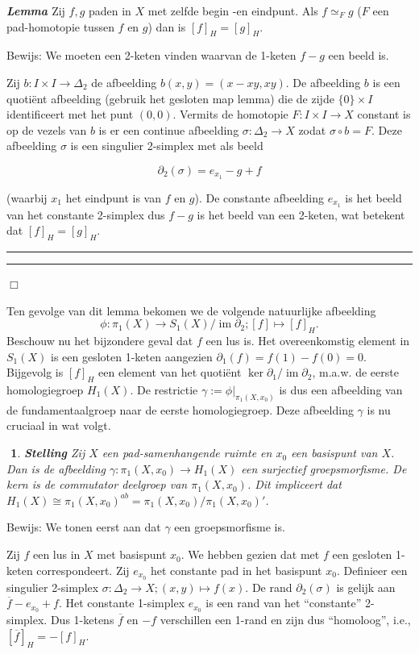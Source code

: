 \documentclass[12pt]{book}
\DeclareMathOperator{\Ima}{im}
\newcommand{\bew}{{\sc Bewijs: }}
\newcommand{\B}{\rule{1mm}{0mm} \hfill $\Box$ }
\newtheorem{stelh}{$\!\!$}[section]
\newenvironment{stel}{\begin{stelh}{\em {\bf Stelling }}}{\end{stelh}}
\newenvironment{lem}{\begin{lemh}{\em {\bf Lemma }}}{\end{lemh}}
\begin{document}
\begin{lem} Zij $f,g$ paden in $X$ met zelfde begin -en eindpunt.  Als $f\simeq_{F} g$ ($F$ een pad-homotopie tussen
$f$ en $g$) dan is $[f]_{H}=[g]_H$.
\end{lem}
\bew We moeten een 2-keten vinden waarvan de 1-keten $f-g$ een beeld is.

Zij $b:I\times I\to \Delta_2$ de afbeelding $b(x,y)=(x-xy,xy)$. De afbeelding $b$ is een quoti\"ent afbeelding (gebruik het gesloten map lemma) die de zijde $\{0\} \times I$ identificeert met het punt $(0,0)$. 
Vermits de homotopie $F:I\times I \to X$ constant is op de vezels van $b$ is er een continue afbeelding $\sigma:\Delta_2\to X$ zodat $\sigma \circ b =F$. Deze afbeelding $\sigma$ is een singulier 2-simplex met als beeld

$$\partial_2(\sigma)=e_{x_{1}}-g+f$$

(waarbij $x_1$ het eindpunt is van $f$ en $g$). De constante afbeelding $e_{x_{1}}$ is het beeld van het constante 2-simplex dus $f-g$ is het beeld van een 2-keten, wat betekent dat $[f]_H=[g]_H$. \rule{1mm}{0mm} \hfill \B 



Ten gevolge van dit lemma bekomen we de volgende natuurlijke afbeelding 
$$\phi: \pi_{1}(X) \to S_1(X) / \Ima \partial_2; [f] \mapsto [f]_H.$$
Beschouw nu het bijzondere geval dat $f$ een lus is. 
Het overeenkomstig element in $S_1(X)$ is een gesloten 1-keten aangezien $\partial_1(f)=f(1)-f(0)=0$.
Bijgevolg is $[f]_H$ een element van het quoti\"ent $\ker \partial_1 / \Ima \partial_2$, m.a.w. de eerste homologiegroep $H_1(X)$. 
De restrictie $\gamma:=\phi\vert_{\pi_1(X,x_0)}$ is dus een afbeelding van de fundamentaalgroep naar de eerste homologiegroep. 
Deze afbeelding $\gamma$ is nu cruciaal in wat volgt.

\begin{stel} Zij $X$ een pad-samenhangende ruimte en $x_0$ een basispunt van $X$. Dan is de afbeelding $\gamma:\pi_{1}(X,x_0)\to H_{1}(X)$ een surjectief groepsmorfisme. De kern is
de commutator deelgroep van $\pi_{1}(X,x_0)$. Dit impliceert dat $H_{1}(X)\cong \pi_{1}(X,x_0)^{ab} = 
\pi_{1}(X,x_0)/\pi_{1}(X,x_0)'$.\end{stel}

\bew 
We tonen eerst aan dat $\gamma$ een groepsmorfisme is. 

Zij $f$ een lus in $X$ met basispunt $x_0$. We hebben gezien dat met $f$  een gesloten 1-keten correspondeert. Zij $e_{x_{0}}$ het constante pad in het basispunt $x_0$. Definieer een singulier 2-simplex $\sigma: \Delta_2 \to X;
(x,y)\mapsto f(x)$. De rand $\partial_2(\sigma)$ is gelijk aan $\overline{f}-e_{x_{0}}+f$. Het constante 1-simplex $e_{x_{0}}$ is een rand van het ``constante'' 2-simplex. Dus 1-ketens $\overline{f}$ en $-f$ verschillen een 1-rand en zijn dus ``homoloog'', i.e., $[\overline{f}]_{H}=-[f]_{H}$.
\end{document}

